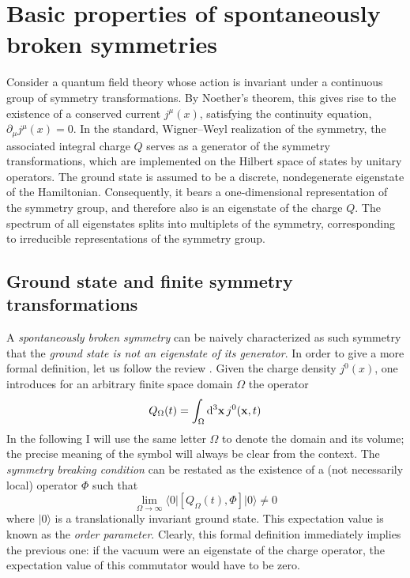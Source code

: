 \documentclass[final,2p,times,12pt,sort&compress]{elsarticle}
\newcommand\vek[1]{{\boldsymbol{\bf #1}}}   %
\newcommand\bra[1]{\langle#1\vert}          %
\newcommand\ket[1]{\vert#1\rangle}          %
\newcommand\de{\partial}
\newcommand\dthree{\mathop{{\rm d}^3\!}\nolimits} %
\begin{document}

\section{Basic properties of spontaneously broken symmetries}
\label{sec:basics}

Consider a quantum field theory whose action is invariant under a continuous
group of symmetry transformations. By Noether's theorem, this gives rise to the
existence of a conserved current $j^\mu(x)$, satisfying the continuity
equation, $\de_\mu j^\mu(x)=0$. In the standard, Wigner--Weyl realization of the
symmetry, the associated integral charge $Q$ serves as a generator of the
symmetry transformations, which are implemented on the Hilbert space of states
by unitary operators. The ground state is assumed to be a discrete,
nondegenerate eigenstate of the Hamiltonian. Consequently, it bears a
one-dimensional representation of the symmetry group, and therefore also is an
eigenstate of the charge $Q$. The spectrum of all eigenstates splits into
multiplets of the symmetry, corresponding to irreducible representations of the
symmetry group.


\subsection{Ground state and finite symmetry transformations}
\label{subsec:groundstate} A \emph{spontaneously broken symmetry} can be
naively characterized as such symmetry that the \emph{ground state is not an
eigenstate of its generator}. In order to give a more formal definition, let us
follow the review \cite{Guralnik:1968gu}. Given the charge density $j^0(x)$,
one introduces for an arbitrary finite space domain $\Omega$ the operator
\begin{equation}
Q_\Omega(t)=\int_\Omega\dthree\vek x\,j^0(\vek x,t)
\label{finiteVcharge}
\end{equation}
In the following I will use the same letter $\Omega$ to denote the domain and
its volume; the precise meaning of the symbol will always be clear from the
context. The \emph{symmetry breaking condition} can be restated as the
existence of a (not necessarily local) operator $\Phi$ such that
\begin{equation}
\lim_{\Omega\to\infty}\bra0[Q_\Omega(t),\Phi]\ket0\neq0
\label{SSBcondition}
\end{equation}
where $\ket0$ is a translationally invariant ground state. This expectation
value is known as the \emph{order parameter}. Clearly, this formal definition
immediately implies the previous one: if the vacuum were an eigenstate of the
charge operator, the expectation value of this commutator would have to be
zero.
\end{document}
